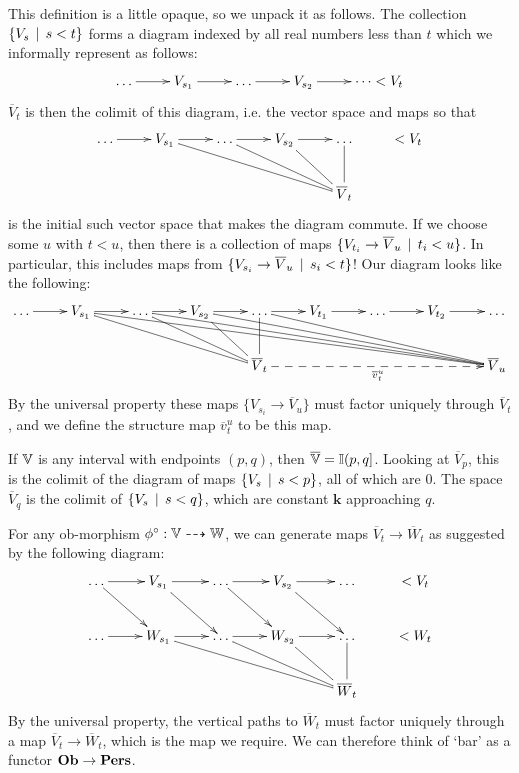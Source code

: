 This definition is a little opaque, so we unpack it as follows. The collection $\{V_s \, \mid \, s < t\}$ forms a diagram indexed by all real numbers less than $t$ which we informally represent as follows:
\begin{displaymath}
\xymatrix{
\dots \ar[r] & V_{s_1} \ar[r] & \dots \ar[r] & V_{s_2} \ar[r] & \dots < V_t
}
\end{displaymath}
$\overline V_t$ is then the colimit of this diagram, i.e. the vector space and maps so that
\begin{displaymath}
\xymatrix{
\dots \ar[r] & V_{s_1} \ar[r] \ar@{-}[drrr] & \dots \ar[r] \ar@{-}[drr] & V_{s_2} \ar[r] \ar@{-}[dr] & \dots \ar@{-}[d] & < V_t \\
& & & & \overline V_t
}
\end{displaymath}
is the initial such vector space that makes the diagram commute. If we choose some $u$ with $t < u$, then there is a collection of maps $\{V_{t_i} \to \overline V_u \, \mid \, t_i < u \}$. In particular, this includes maps from $\{V_{s_i} \to \overline V_u \, \mid \, s_i < t \}$! Our diagram looks like the following:
\begin{displaymath}
\xymatrix{
\dots \ar[r] & V_{s_1} \ar[r] \ar@{-}[drrr] \ar@{-}[drrrrrrr] & \dots \ar[r] \ar@{-}[drr] \ar@{-}[drrrrrr] & V_{s_2} \ar[r] \ar@{-}[dr] \ar@{-}[drrrrr] & \dots \ar[r] \ar@{-}[d] \ar@{-}[drrrr]  & V_{t_1} \ar[r] & \dots \ar[r]  & V_{t_2} \ar[r]  & \dots  \\
& & & & \overline V_t \ar@{-->}[rrrr]_{\overline v_t^u} & & & & \overline V_u
}
\end{displaymath}
By the universal property these maps $\{ V_{s_i} \to \overline V_u \}$ must factor uniquely through $\overline V_t$, and we define the structure map $\overline v_t^u$ to be this map.

\begin{example}
If $\mathbb{V}$ is any interval with endpoints $(p, q)$, then $\overline {\mathbb{V}} = \mathbb{I}(p, q]$. Looking at $\overline V_p$, this is the colimit of the diagram of maps $\{V_s \, \mid \, s < p\}$, all of which are 0. The space $\overline V_q$ is the colimit of $\{V_s \, \mid \, s < q\}$, which are constant $\mathbf{k}$ approaching $q$.
\end{example}

For any ob-morphism $\phi^\circ : \mathbb{V} \dashrightarrow \mathbb{W}$, we can generate maps $\overline V_t \to \overline W_t$ as suggested by the following diagram:
\begin{displaymath}
\xymatrix{
\dots \ar[r] \ar[dr] & V_{s_1} \ar[r] \ar[dr] & \dots \ar[r] \ar[dr] & V_{s_2} \ar[r] \ar[dr] & \dots & < V_t \\
\dots \ar[r] & W_{s_1} \ar[r] \ar@{-}[drrr] & \dots \ar[r] \ar@{-}[drr] & W_{s_2} \ar[r] \ar@{-}[dr] & \dots \ar@{-}[d]& < W_t \\
& & & & \overline W_t
}
\end{displaymath}
By the universal property, the vertical paths to $\overline W_t$ must factor uniquely through a map $\overline V_t \to \overline W_t$, which is the map we require. We can therefore think of `bar' as a functor $\mathbf{Ob} \to \mathbf{Pers}$.

